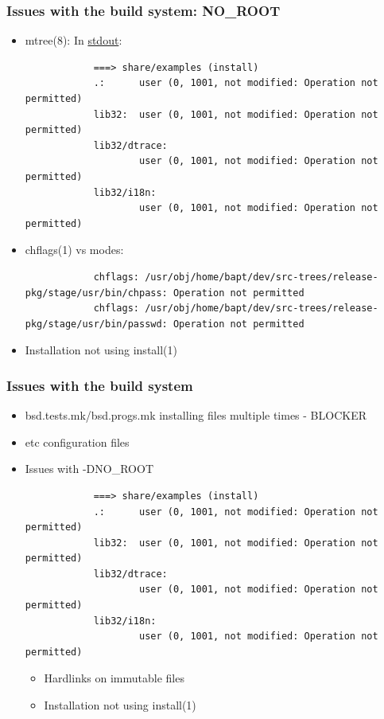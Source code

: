 \begin{frame}[fragile]
	\frametitle{Issues with the build system: NO\_ROOT}
	\begin{itemize}
		\item mtree(8):
			In \underline{stdout}:
			\begin{lstlisting}
			===> share/examples (install)
			.:      user (0, 1001, not modified: Operation not permitted)
			lib32:  user (0, 1001, not modified: Operation not permitted)
			lib32/dtrace: 
			        user (0, 1001, not modified: Operation not permitted)
			lib32/i18n: 
			        user (0, 1001, not modified: Operation not permitted)
			\end{lstlisting}
		\item chflags(1) vs modes:
			\begin{lstlisting}
			chflags: /usr/obj/home/bapt/dev/src-trees/release-pkg/stage/usr/bin/chpass: Operation not permitted
			chflags: /usr/obj/home/bapt/dev/src-trees/release-pkg/stage/usr/bin/passwd: Operation not permitted
			\end{lstlisting}

		\item Installation not using install(1)
	\end{itemize}
\end{frame}

\begin{frame}[fragile]
	\frametitle{Issues with the build system}
	\begin{itemize}
		\item bsd.tests.mk/bsd.progs.mk installing files multiple times - BLOCKER
		\item etc configuration files
		\item Issues with -DNO\_ROOT
			\begin{lstlisting}
			===> share/examples (install)
			.:      user (0, 1001, not modified: Operation not permitted)
			lib32:  user (0, 1001, not modified: Operation not permitted)
			lib32/dtrace: 
			        user (0, 1001, not modified: Operation not permitted)
			lib32/i18n: 
			        user (0, 1001, not modified: Operation not permitted)
			\end{lstlisting}
			\begin{itemize}
				\item Hardlinks on immutable files
				\item Installation not using install(1)
			\end{itemize}
	\end{itemize}
\end{frame}

